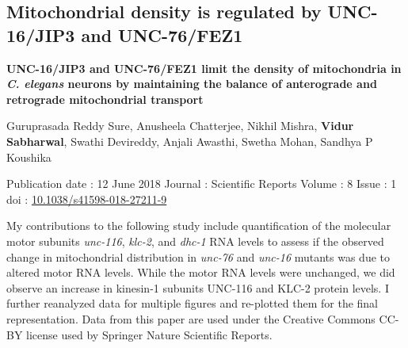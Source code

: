 \begin{appendices}
	\chapter{Mitochondrial density is regulated by UNC-16/JIP3 and UNC-76/FEZ1}
	
	
	\large \textbf{UNC-16/JIP3 and UNC-76/FEZ1 limit the density of mitochondria in \textit{C. elegans} neurons by maintaining the balance of anterograde and retrograde mitochondrial transport}
	
	\small
	Guruprasada Reddy Sure, Anusheela Chatterjee, Nikhil Mishra, \textbf{Vidur Sabharwal}, Swathi Devireddy, Anjali Awasthi, Swetha Mohan, Sandhya P Koushika
	
	Publication date : 12 June 2018
	Journal : Scientific Reports
	Volume : 8
	Issue : 1
	doi : \href{https://doi.org/10.1038/s41598-018-27211-9}{10.1038/s41598-018-27211-9}
	
	\normalsize
	My contributions to the following study include  quantification of the molecular motor subunits \textit{unc-116}, \textit{klc-2}, and \textit{dhc-1} RNA levels to assess if the observed change in mitochondrial distribution in \textit{unc-76} and \textit{unc-16} mutants was due to altered motor RNA levels. While the motor RNA levels were unchanged, we did observe an increase in kinesin-1 subunits UNC-116 and KLC-2 protein levels. I further reanalyzed data for multiple figures and re-plotted them for the final representation. Data from this paper are used under the Creative Commons CC-BY license used by Springer Nature Scientific Reports.
	

\end{appendices}
